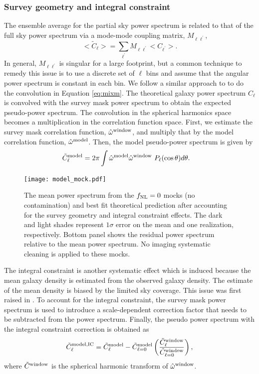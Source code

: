 \subsubsection{Survey geometry and integral constraint}
The ensemble average for the partial sky power spectrum is related to that of the full sky power spectrum via a mode-mode coupling matrix, $M_{\ell \ell^{\prime}}$,
\begin{equation}\label{eq:mixm}
    <\tilde{C}_{\ell}> = \sum_{\ell^{\prime}} M_{\ell \ell^{\prime}}<C_{\ell^{\prime}}>.
\end{equation}
In general, $M_{\ell \ell^{\prime}}$ is singular for a large footprint, but a common technique to remedy this issue is to use a discrete set of $\ell$ bins and assume that the angular power spectrum is constant in each bin. We follow a similar approach to \cite{chon2004fast} to do the convolution in Equation \ref{eq:mixm}. The theoretical galaxy power spectrum $C_{\ell}$ is convolved with the survey mask power spectrum to obtain the expected pseudo-power spectrum. The convolution in the spherical harmonics space becomes a multiplication in the correlation function space. First, we estimate the survey mask correlation function, $\hat{\omega}^{\rm window}$, and multiply that by the model correlation function, $\hat{\omega}^{\rm model}$. Then, the model pseudo-power spectrum is given by
\begin{align}
    \tilde{C}^{\rm model}_{\ell} &= 2\pi \int \hat{\omega}^{\rm model}\hat{\omega}^{\rm window}~P_{\ell}(\cos \theta) d\theta.
\end{align}

 \begin{figure}
\centering
\texttt{[image: model\_mock.pdf]}
\caption{The mean power spectrum from the $f_{\rm NL}=0$ mocks (no contamination) and best fit theoretical prediction after accounting for the survey geometry and integral constraint effects. The dark and light shades represent $1\sigma$ error on the mean and one realization, respectively. Bottom panel shows the residual power spectrum relative to the mean power spectrum. No imaging systematic cleaning is applied to these mocks.}\label{fig:model_mock}
\end{figure}

The integral constraint is another systematic effect which is induced because the mean galaxy density is estimated from the observed galaxy density. The estimate of the mean density is biased by the limited sky coverage. This issue was first raised in \cite{peacock1991large}. To account for the integral constraint, the survey mask power spectrum is used to introduce a scale-dependent correction factor that needs to be subtracted from the power spectrum. Finally, the pseudo power spectrum with the integral constraint correction is obtained as
\begin{equation}
     \tilde{C}^{\rm model, IC}_{\ell} = \tilde{C}^{\rm model}_{\ell} - \tilde{C}^{\rm model}_{\ell=0} \left(\frac{\tilde{C}^{\rm window}_{\ell}}{\tilde{C}^{\rm window}_{\ell=0}}\right),
\end{equation}
where $\tilde{C}^{\rm window}$ is the spherical harmonic transform of $\hat{\omega}^{\rm window}$.

